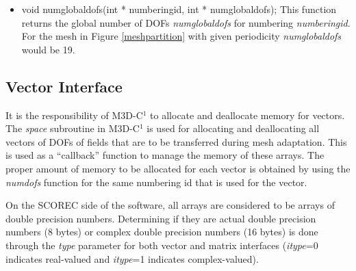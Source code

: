 \begin{itemize}
\item  void numglobaldofs(int * numberingid, int * numglobaldofs);
This function returns the global number of DOFs \textit{numglobaldofs} for numbering \textit{numberingid}. 
 For the mesh in Figure \ref{meshpartition} with given periodicity \textit{numglobaldofs} would be 19.

\end{itemize}
\subsection{Vector Interface}
It is the responsibility of M3D-C$^1$ to allocate and deallocate memory for vectors.  The \textit{space}
subroutine in M3D-C$^1$ is used for allocating and deallocating all vectors of DOFs of fields
that are to be transferred during mesh adaptation.  This is used as a ``callback'' function to 
manage the memory of these arrays.  The proper amount of memory to be allocated for each vector
is obtained by using the \textit{numdofs} function for the same numbering id that is used
for the vector.

On the SCOREC side of the software, all arrays are considered to be arrays of double precision numbers.
Determining if they are actual double precision numbers (8 bytes) or complex double precision numbers
(16 bytes) is done through the \textit{type} parameter for both vector and matrix interfaces 
(\textit{itype}=0 indicates real-valued and \textit{itype}=1 indicates complex-valued).  

